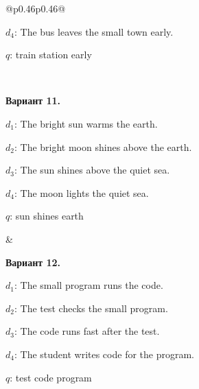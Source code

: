 \documentclass[12pt,a4paper]{article}
\begin{document}
{\begin{longtable}{@{}p{0.46\textwidth}p{0.46\textwidth}@{}}
\begin{minipage}[t]{\linewidth}
$d_4$: The bus leaves the small town early.\par\smallskip
$q$: train station early\par
\end{minipage}\\\noalign{\vskip 14pt}
\begin{minipage}[t]{\linewidth}\vspace{0pt}\raggedright\setlength{\parskip}{0pt}
\textbf{Вариант 11.}\par\smallskip
$d_1$: The bright sun warms the earth.\par\smallskip
$d_2$: The bright moon shines above the earth.\par\smallskip
$d_3$: The sun shines above the quiet sea.\par\smallskip
$d_4$: The moon lights the quiet sea.\par\smallskip
$q$: sun shines earth\par
\end{minipage} &
\begin{minipage}[t]{\linewidth}\vspace{0pt}\raggedright\setlength{\parskip}{0pt}
\textbf{Вариант 12.}\par\smallskip
$d_1$: The small program runs the code.\par\smallskip
$d_2$: The test checks the small program.\par\smallskip
$d_3$: The code runs fast after the test.\par\smallskip
$d_4$: The student writes code for the program.\par\smallskip
$q$: test code program\par
\end{minipage}\\\noalign{\vskip 14pt}
\end{longtable}
}

\par\ifdim\dimexpr\pagegoal-\pagetotal\relax<140pt\relax\newpage\fi
\end{document}
